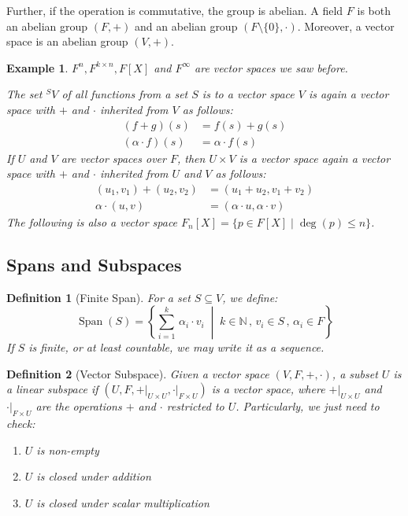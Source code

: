 \documentclass[12pt]{article}
\newcommand{\set}[2]{\left\{{#1}\;\middle|\;{#2}\right\}}
\DeclareMathOperator{\Span}{Span}
\newtheorem{definition}{Definition}[subsection]
\newtheorem{example}{Example}[subsection]
\begin{document}
Further, if the operation is commutative, the group is abelian. A field $F$ is both an abelian group $(F,+)$ and an abelian group $(F\setminus\{0\},\cdot)$. Moreover, a vector space is an abelian group $(V,+)$.

\begin{example}
  $F^n,F^{k\times n},F[X]$ and $F^\infty$ are vector spaces we saw before.

  The set ${}^S V$ of all functions from a set $S$ is to a vector space $V$ is again a vector space with $+$ and $\cdot$ inherited from $V$ as follows:
  \begin{align*}
    (f+g)(s)&=f(s)+g(s)\\
    (\alpha\cdot f)(s)&=\alpha\cdot f(s)
  \end{align*}
  If $U$ and $V$ are vector spaces over $F$, then $U\times V$ is a vector space again a vector space with $+$ and $\cdot$ inherited from $U$ and $V$ as follows:
  \begin{align*}
    (u_1,v_1)+(u_2,v_2)&=(u_1+u_2,v_1+v_2)\\
    \alpha\cdot (u,v)&=(\alpha\cdot u,\alpha\cdot v)
  \end{align*}
  The following is also a vector space $F_n[X]=\big\{p\in F[X]\;|\;\deg(p)\leq n\big\}$.
\end{example}

\subsection{Spans and Subspaces}

\begin{definition}[Finite Span]
  For a set $S\subseteq V$, we define:
  $$\Span(S)=\set{\sum_{i=1}^k\,\alpha_i\cdot v_i}{k\in\mathbb{N}\,,\,v_i\in S\,,\,\alpha_i\in F}$$
  If $S$ is finite, or at least countable, we may write it as a sequence.
\end{definition}

\begin{definition}[Vector Subspace]
  Given a vector space $(V,F,+,\cdot)$, a subset $U$ is a linear subspace if $(U,F,\left.+\right|_{U\times U},\left.\cdot\right|_{F\times U})$ is a vector space, where $\left.+\right|_{U\times U}$ and $\left.\cdot\right|_{F\times U}$ are the operations $+$ and $\cdot$ restricted to $U$. Particularly, we just need to check:
  \begin{enumerate}
    \item $U$ is non-empty
    \item $U$ is closed under addition
    \item $U$ is closed under scalar multiplication
  \end{enumerate}
\end{definition}
\end{document}
